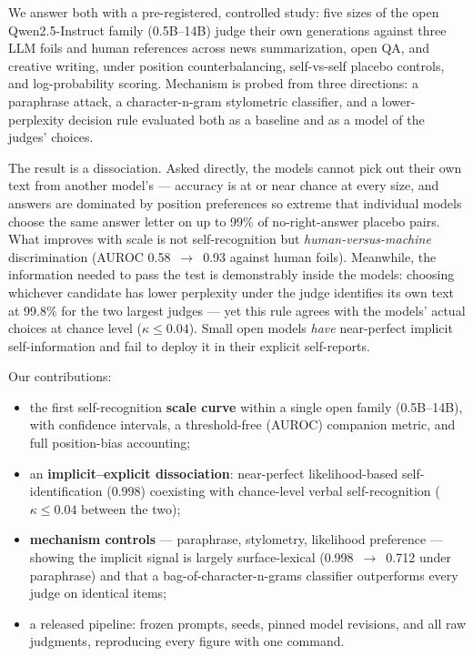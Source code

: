 \documentclass[11pt]{article}
\begin{document}
We answer both with a pre-registered, controlled study: five sizes of the
open Qwen2.5-Instruct family (0.5B--14B) judge their own generations
against three LLM foils and human references across news summarization,
open QA, and creative writing, under position counterbalancing,
self-vs-self placebo controls, and log-probability scoring. Mechanism is
probed from three directions: a paraphrase attack, a character-n-gram
stylometric classifier, and a lower-perplexity decision rule evaluated
both as a baseline and as a model of the judges' choices.

The result is a dissociation. Asked directly, the models cannot pick out
their own text from another model's --- accuracy is at or near chance at
every size, and answers are dominated by position preferences so extreme
that individual models choose the same answer letter on up to 99\% of
no-right-answer placebo pairs. What improves with scale is not
self-recognition but \emph{human-versus-machine} discrimination (AUROC
0.58~$\rightarrow$~0.93 against human foils). Meanwhile, the information
needed to pass the test is demonstrably inside the models: choosing
whichever candidate has lower perplexity under the judge identifies its
own text at 99.8\% for the two largest judges --- yet this rule agrees
with the models' actual choices at chance level ($\kappa \leq 0.04$).
Small open models \emph{have} near-perfect implicit self-information and
fail to deploy it in their explicit self-reports.

\noindent Our contributions:
\begin{itemize}\itemsep0pt
  \item the first self-recognition \textbf{scale curve} within a single
        open family (0.5B--14B), with confidence intervals, a
        threshold-free (AUROC) companion metric, and full position-bias
        accounting;
  \item an \textbf{implicit--explicit dissociation}: near-perfect
        likelihood-based self-identification (0.998) coexisting with
        chance-level verbal self-recognition ($\kappa \leq 0.04$ between
        the two);
  \item \textbf{mechanism controls} --- paraphrase, stylometry, likelihood
        preference --- showing the implicit signal is largely
        surface-lexical (0.998~$\rightarrow$~0.712 under paraphrase) and
        that a bag-of-character-n-grams classifier outperforms every judge
        on identical items;
  \item a released pipeline: frozen prompts, seeds, pinned model
        revisions, and all raw judgments, reproducing every figure with
        one command.
\end{itemize}
\end{document}
